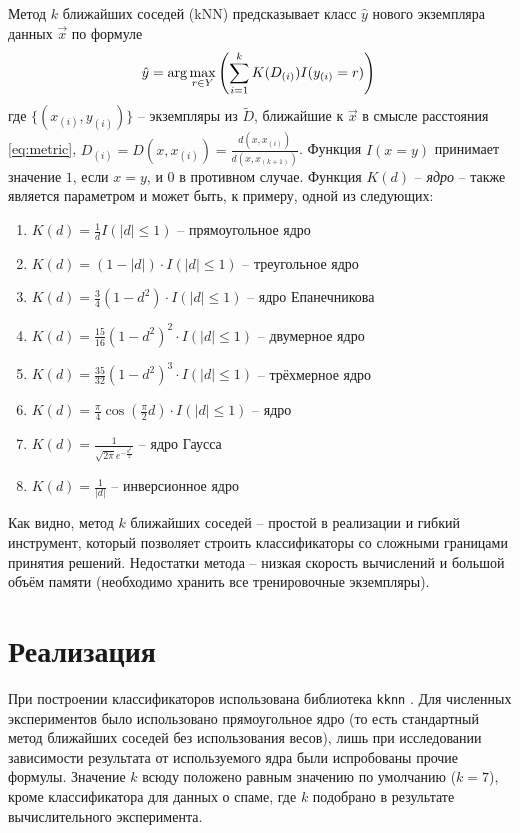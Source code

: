 \documentclass[a4paper,12pt]{article} %
\begin{document}
Метод $k$ ближайших соседей (kNN) предсказывает класс $\hat y$ нового экземпляра данных $ \vec x $ по формуле
\begin{equation}\label{eq:knn}
    \hat y = \arg \max_{r \in Y} \left(\sum_{i=1}^{k}K(D_{(i)}) I(y_{(i)} = r)\right) \\
\end{equation}
где $\{(x_{(i)}, y_{(i)})\}$ -- экземпляры из $\tilde D$, ближайшие к $\vec x$ в смысле расстояния \eqref{eq:metric}, $D_{(i)} = D(x, x_{(i)}) = \frac{d(x, x_{(i)})}{d(x, x_{(k + 1)})} $. Функция $I(x = y)$ принимает значение $1$, если $x=y$, и $0$ в противном случае.  Функция $K(d)$ -- \textit{ядро} -- также является параметром и может быть, к примеру, одной из следующих:
\begin{enumerate}
    \item $K(d) = \frac{1}{d} I(|d| \le 1)$ -- прямоугольное ядро
    \item $K(d) = (1 - |d|) \cdot I(|d| \le 1) $ -- треугольное ядро
    \item $K(d) = \frac{3}{4} (1 - d^2) \cdot I(|d| \le 1) $ -- ядро Епанечникова
    \item $K(d) = \frac{15}{16}(1-d^2)^2 \cdot I(|d| \le 1) $ -- двумерное ядро
    \item $K(d) = \frac{35}{32} (1-d^2)^3 \cdot I(|d| \le 1) $ -- трёхмерное ядро
    \item $K(d) = \frac{\pi}{4} \cos(\frac{\pi}{2}d) \cdot I(|d| \le 1) $ -- ядро
    \item $K(d) = \frac{1}{\sqrt{2\pi} e^{-\frac{d^2}{2}}} $ -- ядро Гаусса
    \item $K(d) = \frac{1}{|d|} $ -- инверсионное ядро
\end{enumerate}

Как видно, метод $k$ ближайших соседей -- простой в реализации и гибкий инструмент, который позволяет строить классификаторы со сложными границами принятия решений. Недостатки метода -- низкая скорость вычислений и большой объём памяти (необходимо хранить все тренировочные экземпляры).

\section{Реализация}

При построении классификаторов использована библиотека \texttt{kknn} \cite{kknn}.
Для численных экспериментов было использовано прямоугольное ядро (то есть стандартный метод ближайших соседей без использования весов), лишь при исследовании зависимости результата от используемого ядра были испробованы прочие формулы. Значение $k$ всюду положено равным значению по умолчанию ($k = 7$), кроме классификатора для данных о спаме, где $k$ подобрано в результате вычислительного эксперимента.
\end{document}
